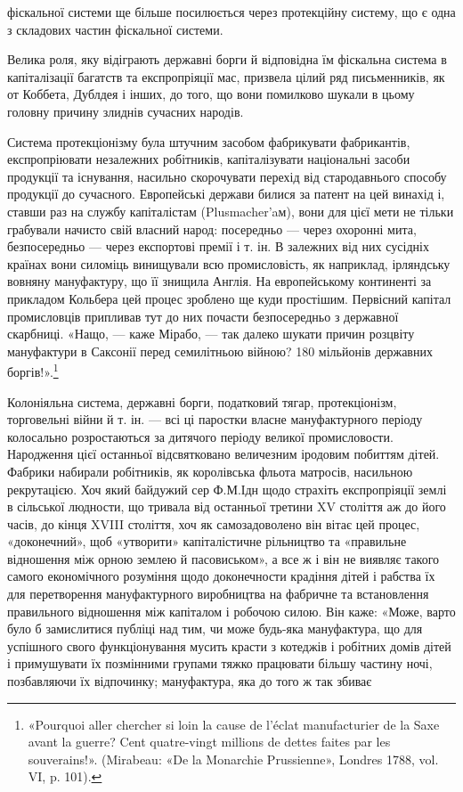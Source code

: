 \parcont{}  %
фіскальної системи ще більше посилюється через протекційну систему, що є одна з складових частин
фіскальної системи.

Велика роля, яку відіграють державні борги й відповідна їм фіскальна система в капіталізації
багатств та експропріяції мас, призвела цілий ряд письменників, як от Коббета, Дублдея і інших, до
того, що вони помилково шукали в цьому головну
причину злиднів сучасних народів.

Система протекціонізму була штучним засобом фабрикувати фабрикантів, експропріювати незалежних
робітників, капіталізувати національні засоби продукції та існування, насильно скорочувати перехід
від стародавнього способу продукції до сучасного. Европейські держави билися за патент на цей
винахід і, ставши раз на службу капіталістам (Plusmacher’aм), вони для цієї мети не тільки грабували
начисто свій власний народ: посередньо — через охоронні мита, безпосередньо — через експортові
премії і т. ін. В залежних від них сусідніх країнах вони силоміць
винищували всю промисловість, як наприклад, ірляндську вовняну мануфактуру, що її знищила Англія. На
европейському континенті за прикладом Кольбера цей процес зроблено ще куди простішим. Первісний
капітал промисловців припливав тут до
них почасти безпосередньо з державної скарбниці. «Нащо, — каже Мірабо, — так далеко шукати причин
розцвіту мануфактури в Саксонії перед семилітньою війною? 180 мільйонів державних боргів!».\footnote{
«Pourquoi aller chercher si loin la cause de l’éclat manufacturier de la Saxe avant la guerre?
Cent quatre-vingt millions de dettes faites par les souverains!». (Mirabeau: «De la Monarchie
Prussienne», Londres 1788, vol. VI, p. 101).
}

Колоніяльна система, державні борги, податковий тягар, протекціонізм, торговельні війни й т. ін. —
всі ці паростки власне мануфактурного періоду колосально розростаються за дитячого періоду великої
промисловости. Народження цієї останньої
відсвятковано величезним іродовим побиттям дітей. Фабрики набирали робітників, як королівська фльота
матросів, насильною рекрутацією. Хоч який байдужий сер Ф.М.Ідн щодо страхіть експропріяції землі в
сільської людности, що тривала від останньої
третини XV століття аж до його часів, до кінця XVIII століття, хоч як самозадоволено він вітає цей
процес, «доконечний», щоб «утворити» капіталістичне рільництво та «правильне відношення між орною
землею й пасовиськом», а все ж і він не виявляє такого самого економічного розуміння щодо
доконечности крадіння дітей і рабства їх для перетворення мануфактурного виробництва на фабричне та
встановлення правильного відношення між капіталом і робочою силою. Він каже: «Може, варто було б
замислитися публіці над тим, чи може будь-яка мануфактура, що для успішного свого функціонування
мусить красти з котеджів і робітних домів дітей і примушувати їх позмінними групами тяжко працювати
більшу частину ночі, позбавляючи їх відпочинку; мануфактура, яка до того ж так збиває
\parbreak{}  %

